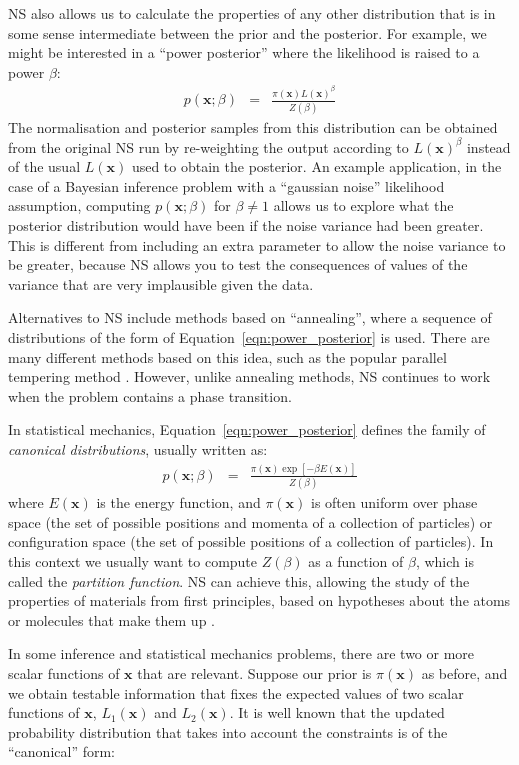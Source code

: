 \documentclass[journal,article,accept,moreauthors,pdftex,12pt,a4paper]{mdpi}
\newcommand{\xx}{\boldsymbol{x}}
\begin{document}
NS also allows us to calculate the properties of any other distribution that
is in some sense intermediate
between the prior and the posterior. For example, we might be interested in
a ``power posterior'' where the likelihood is raised to a power $\beta$:
\begin{eqnarray}
p(\xx; \beta) &=& \frac{\pi(\xx)L(\xx)^\beta}{Z(\beta)}\label{eqn:power_posterior}
\end{eqnarray}
The normalisation and posterior samples from this distribution can be obtained
from the original NS run by re-weighting the output according to $L(\xx)^\beta$
instead of the usual $L(\xx)$ used to obtain the posterior.
An example application, in the case of
a Bayesian inference problem with a ``gaussian noise'' likelihood assumption,
computing $p(\xx; \beta)$ for $\beta \neq 1$ allows us to explore what the
posterior distribution would have been if the noise variance had been greater.
This is different from including an extra parameter to allow the noise variance
to be greater, because NS allows you to test the consequences of values of the
variance that are very implausible given the data.

Alternatives to NS include methods based on ``annealing'', where a sequence of
distributions of the form of Equation~\ref{eqn:power_posterior} is used.
There are many different methods based on this idea, such as the popular
parallel tempering method \citep{pt}.
However, unlike annealing methods, NS continues
to work when the problem contains a phase transition.

In statistical mechanics, Equation~\ref{eqn:power_posterior} defines the
family of {\it canonical distributions}, usually written as:
\begin{eqnarray}
p(\xx; \beta) &=& \frac{\pi(\xx)\exp[-\beta E(\xx)]}{Z(\beta)}
\end{eqnarray}
where $E(\xx)$ is the energy function, and $\pi(\xx)$ is often uniform over
phase space (the set of possible positions and momenta of a collection of
particles) or configuration space (the set of possible positions of a collection
of particles). In this context we usually want to
compute $Z(\beta)$ as a function of $\beta$, which is called the
{\it partition function}. NS can achieve this, allowing the study of
the properties of materials from first principles, based on hypotheses about
the atoms or molecules that make them up \citep[e.g.][]{2009arXiv0906.3544P,
2014PhRvE..89b2302P, 2015arXiv150303404B}.

In some inference and
statistical mechanics problems, there are two or more scalar functions of
$\xx$ that are relevant. Suppose our prior is $\pi(\xx)$ as before, and
we obtain testable information that fixes the expected values of two scalar
functions of $\xx$, $L_1(\xx)$ and $L_2(\xx)$. It is well known that the
updated probability distribution that takes into account the constraints is
of the ``canonical'' form:
\end{document}
